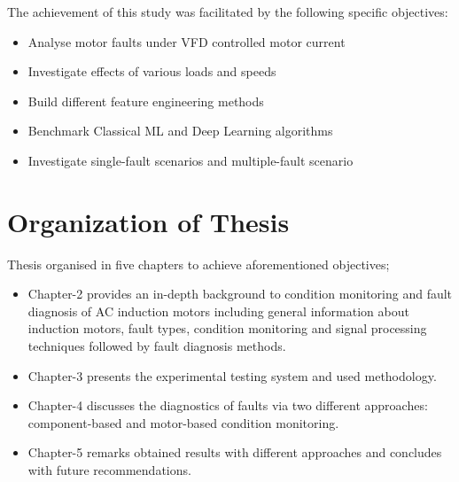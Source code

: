 The achievement of this study was facilitated by the following specific objectives:
\begin{itemize}
\item Analyse motor faults under VFD controlled motor current
\item Investigate effects of various loads and speeds
\item Build different feature engineering methods 
\item Benchmark Classical ML and Deep Learning algorithms
\item Investigate single-fault scenarios and multiple-fault scenario 
\end{itemize}

\section{Organization of Thesis}
\label{organization}

Thesis organised in five chapters to achieve aforementioned objectives;
\begin{itemize}
\item Chapter-2 provides an in-depth background to condition monitoring and fault diagnosis of AC induction motors including general information about induction motors, fault types, condition monitoring and signal processing techniques followed by fault diagnosis methods.

\item Chapter-3 presents the experimental testing system and used methodology.

\item Chapter-4 discusses the diagnostics of faults via two different approaches: component-based and motor-based condition monitoring.

\item Chapter-5 remarks obtained results with different approaches and concludes with future recommendations.

\end{itemize}